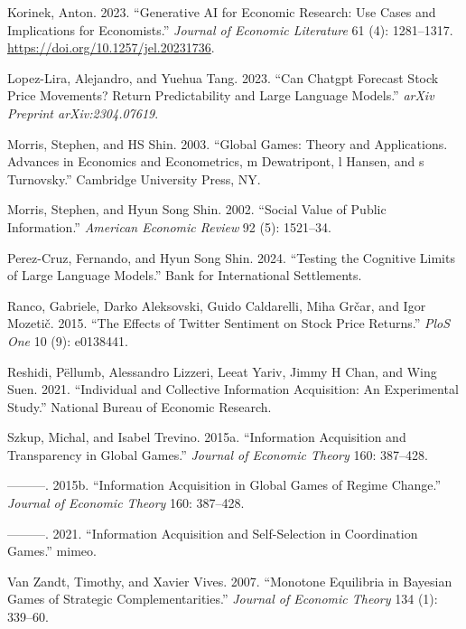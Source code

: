 \documentclass[
]{article}
\newlength{\cslhangindent}
\newenvironment{CSLReferences}[2] %
 {\begin{list}{}{%
  \setlength{\itemindent}{0pt}
  \setlength{\leftmargin}{0pt}
  \setlength{\parsep}{0pt}
  \ifodd #1
   \setlength{\leftmargin}{\cslhangindent}
   \setlength{\itemindent}{-1\cslhangindent}
  \fi
  \setlength{\itemsep}{#2\baselineskip}}}
 {\end{list}}
\theoremstyle{plain}
\theoremstyle{remark}
\begin{document}
\begin{CSLReferences}{1}{0}
Korinek, Anton. 2023. {``Generative AI for Economic Research: Use Cases
and Implications for Economists.''} \emph{Journal of Economic
Literature} 61 (4): 1281--1317.
\url{https://doi.org/10.1257/jel.20231736}.

Lopez-Lira, Alejandro, and Yuehua Tang. 2023. {``Can Chatgpt Forecast
Stock Price Movements? Return Predictability and Large Language
Models.''} \emph{arXiv Preprint arXiv:2304.07619}.

Morris, Stephen, and HS Shin. 2003. {``Global Games: Theory and
Applications. Advances in Economics and Econometrics, m Dewatripont, l
Hansen, and s Turnovsky.''} Cambridge University Press, NY.

Morris, Stephen, and Hyun Song Shin. 2002. {``Social Value of Public
Information.''} \emph{American Economic Review} 92 (5): 1521--34.

Perez-Cruz, Fernando, and Hyun Song Shin. 2024. {``Testing the Cognitive
Limits of Large Language Models.''} Bank for International Settlements.

Ranco, Gabriele, Darko Aleksovski, Guido Caldarelli, Miha Grčar, and
Igor Mozetič. 2015. {``The Effects of Twitter Sentiment on Stock Price
Returns.''} \emph{PloS One} 10 (9): e0138441.

Reshidi, Pëllumb, Alessandro Lizzeri, Leeat Yariv, Jimmy H Chan, and
Wing Suen. 2021. {``Individual and Collective Information Acquisition:
An Experimental Study.''} National Bureau of Economic Research.

Szkup, Michal, and Isabel Trevino. 2015a. {``Information Acquisition and
Transparency in Global Games.''} \emph{Journal of Economic Theory} 160:
387--428.

---------. 2015b. {``Information Acquisition in Global Games of Regime
Change.''} \emph{Journal of Economic Theory} 160: 387--428.

---------. 2021. {``Information Acquisition and Self-Selection in
Coordination Games.''} mimeo.

Van Zandt, Timothy, and Xavier Vives. 2007. {``Monotone Equilibria in
Bayesian Games of Strategic Complementarities.''} \emph{Journal of
Economic Theory} 134 (1): 339--60.


\end{CSLReferences}
\end{document}
